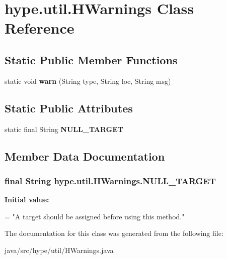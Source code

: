 \hypertarget{classhype_1_1util_1_1_h_warnings}{\section{hype.\-util.\-H\-Warnings Class Reference}
\label{classhype_1_1util_1_1_h_warnings}
}
\subsection*{Static Public Member Functions}
\begin{DoxyCompactItemize}
\item 
\hypertarget{classhype_1_1util_1_1_h_warnings_adb2c54a7d206d7e7bdeb58cfad2d0169}{static void {\bfseries warn} (String type, String loc, String msg)}\label{classhype_1_1util_1_1_h_warnings_adb2c54a7d206d7e7bdeb58cfad2d0169}

\end{DoxyCompactItemize}
\subsection*{Static Public Attributes}
\begin{DoxyCompactItemize}
\item 
static final String {\bfseries N\-U\-L\-L\-\_\-\-T\-A\-R\-G\-E\-T}
\end{DoxyCompactItemize}


\subsection{Member Data Documentation}
\hypertarget{classhype_1_1util_1_1_h_warnings_a8992fc45f97be882c79eceb0df3b4cec}{
\subsubsection[{N\-U\-L\-L\-\_\-\-T\-A\-R\-G\-E\-T}]{\setlength{\rightskip}{0pt plus 5cm}final String hype.\-util.\-H\-Warnings.\-N\-U\-L\-L\-\_\-\-T\-A\-R\-G\-E\-T\hspace{0.3cm}{\ttfamily [static]}}}\label{classhype_1_1util_1_1_h_warnings_a8992fc45f97be882c79eceb0df3b4cec}
{\bfseries Initial value\-:}
\begin{DoxyCode}
=
        \textcolor{stringliteral}{"A target should be assigned before using this method."}
\end{DoxyCode}


The documentation for this class was generated from the following file\-:\begin{DoxyCompactItemize}
\item 
java/src/hype/util/H\-Warnings.\-java\end{DoxyCompactItemize}
